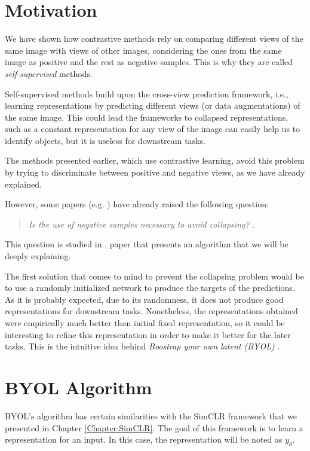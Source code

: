 \label{Chapter:BYOL}

\section{Motivation}

We have shown how contrastive methods rely on comparing different views of the same image with views of other images, considering the ones from the same image as positive and the rest as negative samples. This is why they are called \emph{self-supervised} methods.

Self-supervised methods build upon the cross-view prediction framework, i.e., learning representations by predicting different views (or data augmentations) of the same image. This could lead the frameworks to collapsed representations, such as a constant representation for any view of the image can easily help us to identify objects, but it is useless for downstream tasks.

The methods presented earlier, which use contrastive learning, avoid this problem by trying to discriminate between positive and negative views, as we have already explained.

However, some papers (e.g. \cite{caron2019deep}) have already raised the following question:

\begin{quote}
    \centering
\emph{ Is the use of negative samples necessary to avoid collapsing? }. 
\end{quote}
This question is studied in \cite{grill2020bootstrap}, paper that presents an algorithm that we will be deeply explaining.

The first solution that comes to mind to prevent the collapsing problem would be to use a randomly initialized network to produce the targets of the predictions. As it is probably expected, due to its randomness, it does not produce good representations for downstream tasks. Nonetheless, the representations obtained were empirically much better than initial fixed representation, so it could be interesting to refine this representation in order to make it better for the later tasks. This is the intuitive idea behind \emph{Boostrap your own latent (BYOL)} \citep{grill2020bootstrap}.

\section{BYOL Algorithm}

BYOL's algorithm has certain similarities with the SimCLR framework that we presented in Chapter \ref{Chapter:SimCLR}. The goal of this framework is to learn a representation for an input. In this case, the representation will be noted as $y_\theta$. 

